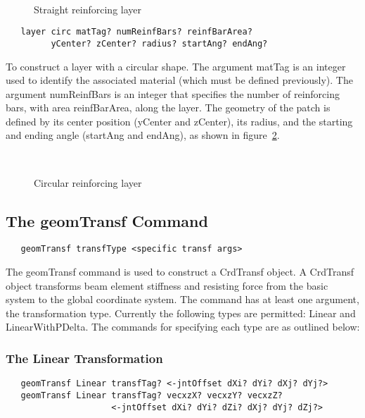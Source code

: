 \documentclass[12pt]{article}
\begin{document}
\begin{figure}[htpb]
\begin{center}
\leavevmode
\hbox{%
}
\end{center}
\caption{Straight reinforcing layer}
\label{straightLayer}
\end{figure}




{\sf\small
\begin{verbatim}
   layer circ matTag? numReinfBars? reinfBarArea? 
         yCenter? zCenter? radius? startAng? endAng?
\end{verbatim}
}

\noindent To construct a layer with a circular shape. The
argument matTag is an integer used to identify the associated
material (which must be defined previously). The argument 
numReinfBars is an integer that specifies the number of reinforcing 
bars, with area reinfBarArea, along the layer. 
The geometry of the patch is defined by its center position
(yCenter and zCenter), its radius, and the starting and ending angle 
(startAng and endAng), as shown in figure~\ref{circLayer}. 


\begin{figure}[htpb]
\begin{center}
\leavevmode
\hbox{%
}
\end{center}
\caption{Circular reinforcing layer}
\label{circLayer}
\end{figure}


\subsection{The geomTransf Command}
{\sf\small
\begin{verbatim}
   geomTransf transfType <specific transf args>
\end{verbatim}
}

The geomTransf command is used to construct a CrdTransf object. A CrdTransf
object transforms beam element stiffness and resisting force from the 
basic system to the global coordinate system. The command has at least one 
argument, the transformation type. Currently the following types are 
permitted: Linear and LinearWithPDelta. The commands for specifying each 
type are as outlined below: 

\subsubsection{The Linear Transformation}
{\sf\small
\begin{verbatim}
   geomTransf Linear transfTag? <-jntOffset dXi? dYi? dXj? dYj?>
   geomTransf Linear transfTag? vecxzX? vecxzY? vecxzZ?
                     <-jntOffset dXi? dYi? dZi? dXj? dYj? dZj?>
\end{verbatim}
}
\end{document}
